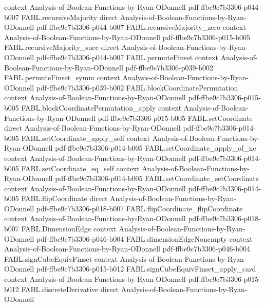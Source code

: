 \begin{theorem}
  {context}
  {Analysis-of-Boolean-Functions-by-Ryan-ODonnell}
  {pdf-ffbe9c7b3306-p044-b007}
\proofstep
  {FABL.recursiveMajority}
  {direct}
  {Analysis-of-Boolean-Functions-by-Ryan-ODonnell}
  {pdf-ffbe9c7b3306-p044-b007}
\proofstep
  {FABL.recursiveMajority_zero}
  {context}
  {Analysis-of-Boolean-Functions-by-Ryan-ODonnell}
  {pdf-ffbe9c7b3306-p015-b005}
\proofstep
  {FABL.recursiveMajority_succ}
  {direct}
  {Analysis-of-Boolean-Functions-by-Ryan-ODonnell}
  {pdf-ffbe9c7b3306-p044-b007}
\proofstep
  {FABL.permuteFinset}
  {context}
  {Analysis-of-Boolean-Functions-by-Ryan-ODonnell}
  {pdf-ffbe9c7b3306-p039-b002}
\proofstep
  {FABL.permuteFinset_symm}
  {context}
  {Analysis-of-Boolean-Functions-by-Ryan-ODonnell}
  {pdf-ffbe9c7b3306-p039-b002}
\proofstep
  {FABL.blockCoordinatePermutation}
  {context}
  {Analysis-of-Boolean-Functions-by-Ryan-ODonnell}
  {pdf-ffbe9c7b3306-p015-b005}
\proofstep
  {FABL.blockCoordinatePermutation_apply}
  {context}
  {Analysis-of-Boolean-Functions-by-Ryan-ODonnell}
  {pdf-ffbe9c7b3306-p015-b005}
\proofstep
  {FABL.setCoordinate}
  {direct}
  {Analysis-of-Boolean-Functions-by-Ryan-ODonnell}
  {pdf-ffbe9c7b3306-p014-b005}
\proofstep
  {FABL.setCoordinate_apply_self}
  {context}
  {Analysis-of-Boolean-Functions-by-Ryan-ODonnell}
  {pdf-ffbe9c7b3306-p014-b005}
\proofstep
  {FABL.setCoordinate_apply_of_ne}
  {context}
  {Analysis-of-Boolean-Functions-by-Ryan-ODonnell}
  {pdf-ffbe9c7b3306-p014-b005}
\proofstep
  {FABL.setCoordinate_eq_self}
  {context}
  {Analysis-of-Boolean-Functions-by-Ryan-ODonnell}
  {pdf-ffbe9c7b3306-p014-b005}
\proofstep
  {FABL.setCoordinate_setCoordinate}
  {context}
  {Analysis-of-Boolean-Functions-by-Ryan-ODonnell}
  {pdf-ffbe9c7b3306-p014-b005}
\proofstep
  {FABL.flipCoordinate}
  {direct}
  {Analysis-of-Boolean-Functions-by-Ryan-ODonnell}
  {pdf-ffbe9c7b3306-p018-b007}
\proofstep
  {FABL.flipCoordinate_flipCoordinate}
  {context}
  {Analysis-of-Boolean-Functions-by-Ryan-ODonnell}
  {pdf-ffbe9c7b3306-p018-b007}
\proofstep
  {FABL.DimensionEdge}
  {context}
  {Analysis-of-Boolean-Functions-by-Ryan-ODonnell}
  {pdf-ffbe9c7b3306-p046-b004}
\proofstep
  {FABL.dimensionEdgeNonempty}
  {context}
  {Analysis-of-Boolean-Functions-by-Ryan-ODonnell}
  {pdf-ffbe9c7b3306-p046-b004}
\proofstep
  {FABL.signCubeEquivFinset}
  {context}
  {Analysis-of-Boolean-Functions-by-Ryan-ODonnell}
  {pdf-ffbe9c7b3306-p015-b012}
\proofstep
  {FABL.signCubeEquivFinset_apply_card}
  {context}
  {Analysis-of-Boolean-Functions-by-Ryan-ODonnell}
  {pdf-ffbe9c7b3306-p015-b012}
\proofstep
  {FABL.discreteDerivative}
  {direct}
  {Analysis-of-Boolean-Functions-by-Ryan-ODonnell}

\end{theorem}
